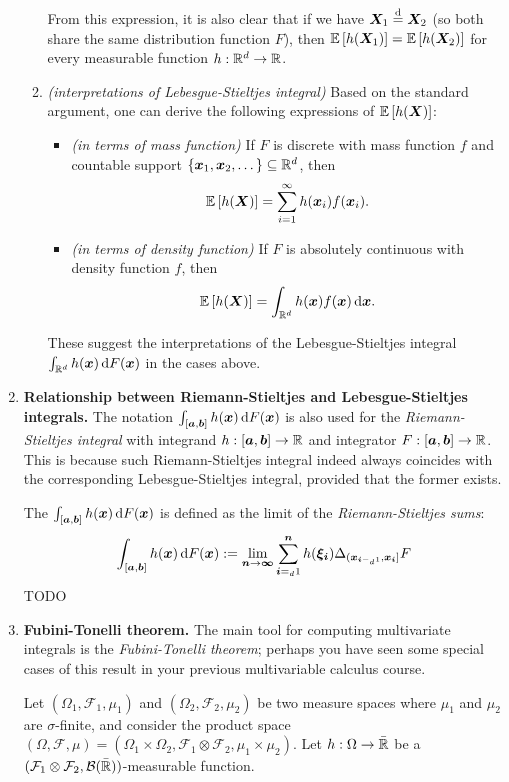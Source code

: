 \begin{enumerate}
\begin{enumerate}
From this expression, it is also clear that if we have \(\bm{X}_1\overset{\text{d}}=
\bm{X}_2\) (so both share the same distribution function \(F\)), then
\(\mathbb{E}\left[h(\bm{X}_1)\right]=\mathbb{E}\left[h(\bm{X}_2)\right]\) for every measurable function
\(h:\mathbb{R}^d\to\mathbb{R}\).
\item \emph{(interpretations of Lebesgue-Stieltjes integral)}
Based on the standard argument, one can derive the following expressions of
\(\mathbb{E}\left[h(\bm{X})\right]\):
\begin{itemize}
\item \emph{(in terms of mass function)} If \(F\) is discrete with mass
function \(f\) and countable support
\(\{\bm{x}_1,\bm{x}_2,\dotsc\}\subseteq \mathbb{R}^d\), then
\[
\mathbb{E}\left[h(\bm{X})\right]=\sum_{i=1}^{\infty}h(\bm{x}_i)f(\bm{x}_i).
\]
\item \emph{(in terms of density function)} If \(F\) is absolutely continuous
with density function \(f\), then
\[
\expv{h(\vect{X})}=\int_{\R^d}^{}h(\vect{x})f(\vect{x})\odif{\vect{x}}.
\]
\end{itemize}
These suggest the interpretations of the Lebesgue-Stieltjes integral
\(\int_{\R^d}^{}h(\vect{x})\odif{F(\vect{x})}\) in the cases above.
\end{enumerate}
\item \textbf{Relationship between Riemann-Stieltjes and Lebesgue-Stieltjes integrals.}
The notation \(\int_{[\vect{a},\vect{b}]}^{}h(\vect{x})\odif{F(\vect{x})}\) is
also used for the \emph{Riemann-Stieltjes integral} with integrand
\(h:[\bm{a},\bm{b}]\to\mathbb{R}\) and integrator \(F:[\bm{a},\bm{b}]\to\mathbb{R}\).
This is because such Riemann-Stieltjes integral indeed always coincides with the
corresponding Lebesgue-Stieltjes integral, provided that the former exists.

The 
\(\int_{[\vect{a},\vect{b}]}^{}h(\vect{x})\odif{F(\vect{x})}\) is defined as
the limit of the \emph{Riemann-Stieltjes sums}:
\[
\int_{[\vect{a},\vect{b}]}^{}h(\vect{x})\odif{F(\vect{x})}:=\lim_{\vect{n}\to\vect{\infty}}
\sum_{\vect{i}={}_{d}1}^{\vect{n}}h(\vect{\xi}_{\vect{i}})
\Delta_{(\vect{x}_{\vect{i}-{}_{d}1},\vect{x}_{\vect{i}}]}F
\]
TODO
\item \textbf{Fubini-Tonelli theorem.} The main tool for computing multivariate
integrals is the \emph{Fubini-Tonelli theorem}; perhaps you have seen some
special cases of this result in your previous multivariable calculus course.

\begin{theorem}
\label{thm:fubini-tonelli}
Let \((\Omega_1,\mathcal{F}_1,\mu_1)\) and \((\Omega_2,\mathcal{F}_2,\mu_2)\)
be two measure spaces where \(\mu_1\) and \(\mu_2\) are \(\sigma\)-finite, and
consider the product space \((\Omega,\mathcal{F},\mu)=(\Omega_1\times
\Omega_2,\mathcal{F}_1\otimes\mathcal{F}_2,\mu_1\times \mu_2)\). Let
\(h:\Omega\to\bar{\mathbb{R}}\) be a
\((\mathcal{F}_1\otimes\mathcal{F}_2,\mathcal{B}(\bar{\mathbb{R}}))\)-measurable function.


\end{theorem}
\end{enumerate}
